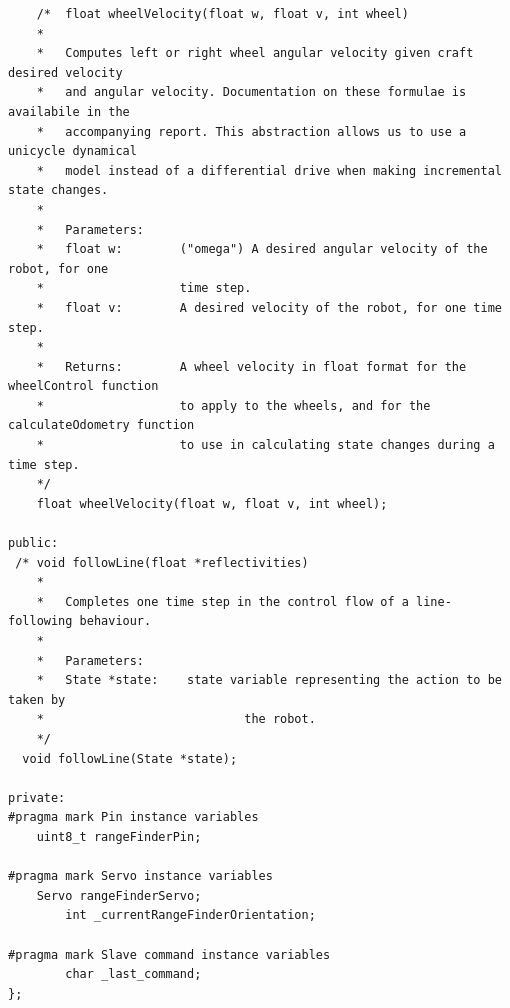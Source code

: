 \documentclass[paper=a4, fontsize=11pt]{scrartcl}
\numberwithin{equation}{section}		%
\numberwithin{figure}{section}			%
\numberwithin{table}{section}				%
\begin{document}
{\begin{verbatim}
	/*	float wheelVelocity(float w, float v, int wheel)	
	*
	*	Computes left or right wheel angular velocity given craft desired velocity
	*  	and angular velocity. Documentation on these formulae is availabile in the
	*	accompanying report. This abstraction allows us to use a unicycle dynamical
	*	model instead of a differential drive when making incremental state changes.
	*	
	*	Parameters:		
	*	float w:		("omega") A desired angular velocity of the robot, for one 
	*					time step.
	*	float v:		A desired velocity of the robot, for one time step.
	*		
	*	Returns:		A wheel velocity in float format for the wheelControl function
	*					to apply to the wheels, and for the calculateOdometry function
	*					to use in calculating state changes during a time step.
	*/	
	float wheelVelocity(float w, float v, int wheel);
 
public:
 /*	void followLine(float *reflectivities)	
	*
	*	Completes one time step in the control flow of a line-following behaviour.
	*	
	*	Parameters:		
	*	State *state:	 state variable representing the action to be taken by
	* 							 the robot.
	*/	
  void followLine(State *state);
    
private:
#pragma mark Pin instance variables
    uint8_t rangeFinderPin;
    
#pragma mark Servo instance variables
    Servo rangeFinderServo;
		int _currentRangeFinderOrientation;
		
#pragma mark Slave command instance variables
		char _last_command;
};


\end{verbatim}}
\end{document}
